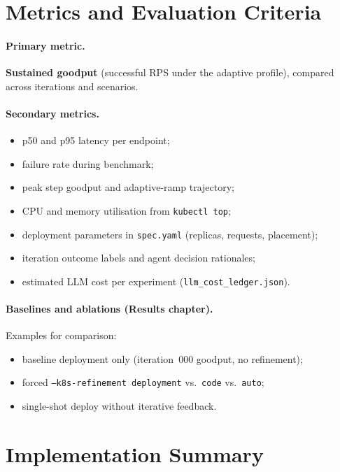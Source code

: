 \section{Metrics and Evaluation Criteria}
\label{sec:methods-metrics}

\paragraph{Primary metric.}
\textbf{Sustained goodput} (successful RPS under the adaptive profile), compared
across iterations and scenarios.

\paragraph{Secondary metrics.}
\begin{itemize}
  \item p50 and p95 latency per endpoint;
  \item failure rate during benchmark;
  \item peak step goodput and adaptive-ramp trajectory;
  \item CPU and memory utilisation from \texttt{kubectl top};
  \item deployment parameters in \texttt{spec.yaml} (replicas, requests, placement);
  \item iteration outcome labels and agent decision rationales;
  \item estimated LLM cost per experiment (\texttt{llm\_cost\_ledger.json}).
\end{itemize}

\paragraph{Baselines and ablations (Results chapter).}
Examples for comparison:
\begin{itemize}
  \item baseline deployment only (iteration~000 goodput, no refinement);
  \item forced \texttt{--k8s-refinement deployment} vs.\ \texttt{code} vs.\
        \texttt{auto};
  \item single-shot deploy without iterative feedback.
\end{itemize}


\section{Implementation Summary}
\label{sec:methods-implementation}

